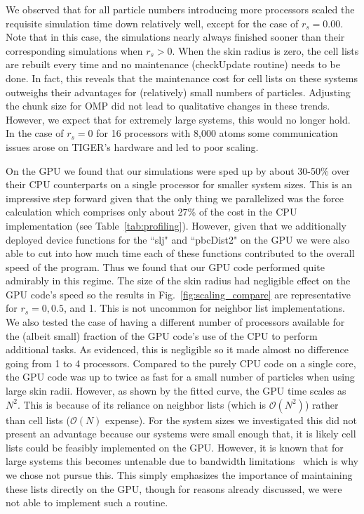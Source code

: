 \documentclass[12pt]{article}
\begin{document}
We observed that for all particle numbers introducing more processors scaled the requisite simulation time down relatively well, except for the case of $r_{s} = 0.00$. Note that in this case, the simulations nearly always finished sooner than their corresponding simulations when $r_s > 0$.  When the skin radius is zero, the cell lists are rebuilt every time and no maintenance (checkUpdate routine) needs to be done.  In fact, this reveals that the maintenance cost for cell lists on these systems outweighs their advantages for (relatively) small numbers of particles.  Adjusting the chunk size for OMP did not lead to qualitative changes in these trends.  However, we expect that for extremely large systems, this would no longer hold.  In the case of $r_s = 0$ for 16 processors with 8,000 atoms some communication issues arose on TIGER's hardware and led to poor scaling.  

On the GPU we found that our simulations were sped up by about 30-50\% over their CPU counterparts on a single processor for smaller system sizes.  This is an impressive step forward given that the only thing we parallelized was the force calculation which comprises only about 27\% of the cost in the CPU implementation (see Table~\ref{tab:profiling}).  However, given that we additionally deployed device functions for the ``slj" and ``pbcDist2" on the GPU we were also able to cut into how much time each of these functions contributed to the overall speed of the program.  Thus we found that our GPU code performed quite admirably in this regime.  The size of the skin radius had negligible effect on the GPU code's speed so the results in Fig.~\ref{fig:scaling_compare} are representative for $r_s = 0,0.5$, and 1.  This is not uncommon for neighbor list implementations.  We also tested the case of having a different number of processors available for the (albeit small) fraction of the GPU code's use of the CPU to perform additional tasks.  As evidenced, this is negligible so it made almost no difference going from 1 to 4 processors.  Compared to the purely CPU code on a single core, the GPU code was up to twice as fast for a small number of particles when using large skin radii.  However, as shown by the fitted curve, the GPU time scales as $N^2$.  This is because of its reliance on neighbor lists (which is $\mathcal{O}(N^2)$) rather than cell lists ($\mathcal{O}(N)$ expense).  For the system sizes we investigated this did not present an advantage because our systems were small enough that, it is likely cell lists could be feasibly implemented on the GPU.   However, it is known that for large systems this becomes untenable due to bandwidth limitations~\cite{Anderson2008, Lipscomb2012} which is why we chose not pursue this.  This simply emphasizes the importance of maintaining these lists directly on the GPU, though for reasons already discussed, we were not able to implement such a routine.
\end{document}
